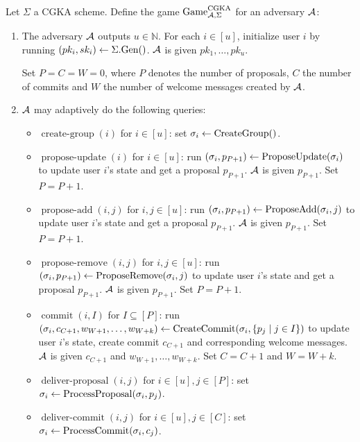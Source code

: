 \begin{definition}
	Let $\Sigma$ a CGKA scheme. Define the game $\mathrm{Game}_{\mathcal{A}, \Sigma}^{\mathrm{CGKA}}$ for an adversary $\mathcal{A}$:
	\begin{enumerate}[1.]
		\item \label{def:cgka-game-step-1} The adversary $\mathcal{A}$ outputs $u \in \mathbb{N}$. For each $i \in [u]$, initialize user $i$ by running $(pk_i, sk_i) \leftarrow \Sigma.\mathrm{Gen}()$. $\mathcal{A}$ is given $pk_1, \ldots, pk_u$.

		      Set $P = C = W = 0$, where $P$ denotes the number of proposals, $C$ the number of commits and $W$ the number of welcome messages created by $\mathcal{A}$.
		\item $\mathcal{A}$ may adaptively do the following queries:
		      \begin{itemize}
			      \item $\operatorname{create-group}(i)$ for $i \in [u]$: set $\sigma_i \leftarrow \operatorname{CreateGroup}()$.
			      \item $\operatorname{propose-update}(i)$ for $i \in [u]$: run $(\sigma_i, p_{P + 1}) \leftarrow \operatorname{ProposeUpdate}(\sigma_i)$ to update user $i$'s state and get a proposal $p_{P + 1}$. $\mathcal{A}$ is given $p_{P + 1}$. Set $P = P + 1$.
			      \item $\operatorname{propose-add}(i, j)$ for $i, j \in [u]$: run $(\sigma_i, p_{P + 1}) \leftarrow \operatorname{ProposeAdd}(\sigma_i, j)$ to update user $i$'s state and get a proposal $p_{P + 1}$. $\mathcal{A}$ is given $p_{P + 1}$. Set $P = P + 1$.
			      \item $\operatorname{propose-remove}(i, j)$ for $i, j \in [u]$: run $(\sigma_i, p_{P + 1}) \leftarrow \operatorname{ProposeRemove}(\sigma_i, j)$ to update user $i$'s state and get a proposal $p_{P + 1}$. $\mathcal{A}$ is given $p_{P + 1}$. Set $P = P + 1$.
			      \item $\operatorname{commit}(i, I)$ for $I \subseteq [P]$: run $(\sigma_i, c_{C + 1}, w_{W + 1}, \ldots, w_{W + k}) \leftarrow \operatorname{CreateCommit}(\sigma_i, \{p_j \mid j \in I\})$ to update user $i$'s state, create commit $c_{C + 1}$ and corresponding welcome messages. $\mathcal{A}$ is given $c_{C + 1}$ and $w_{W + 1}, \ldots, w_{W + k}$. Set $C = C + 1$ and $W = W + k$.
			      \item $\operatorname{deliver-proposal}(i, j)$ for $i \in [u], j \in [P]$: set $\sigma_i \leftarrow \operatorname{ProcessProposal}(\sigma_i, p_j)$.
			      \item $\operatorname{deliver-commit}(i, j)$ for $i \in [u], j \in [C]$: set $\sigma_i \leftarrow \operatorname{ProcessCommit}(\sigma_i, c_j)$.

\end{itemize}
\end{enumerate}
\end{definition}
